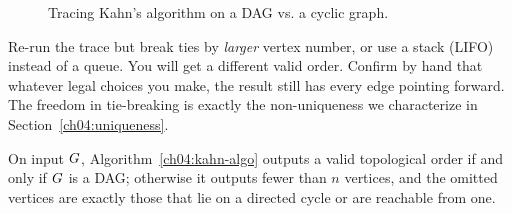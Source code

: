 \begin{figure}[htbp]
\caption{Tracing Kahn's algorithm on a DAG vs. a cyclic graph.}
\label{fig:ch04-kahn-trace}
\end{figure}

\begin{labbox}
Re-run the trace but break ties by \emph{larger} vertex number, or use a stack (LIFO) instead of a
queue. You will get a different valid order. Confirm by hand that whatever legal choices you make, the
result still has every edge pointing forward. The freedom in tie-breaking is exactly the
non-uniqueness we characterize in Section~\ref{ch04:uniqueness}.
\end{labbox}

\begin{theorem}\label{ch04:kahn-correct}
On input $G$, Algorithm~\ref{ch04:kahn-algo} outputs a valid topological order if and only if
$G$ is a DAG; otherwise it outputs fewer than $n$ vertices, and the omitted vertices are exactly
those that lie on a directed cycle or are reachable from one.
\end{theorem}

